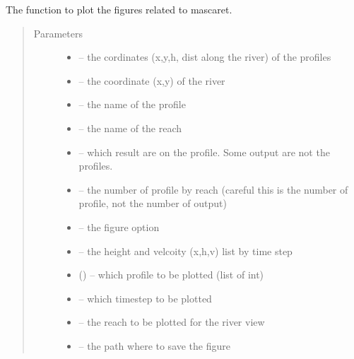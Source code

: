 \documentclass[letterpaper,10pt,english]{sphinxmanual}
\begin{document}
\begin{fulllineitems}
\label{\detokenize{index:src.mascaret.figure_mascaret}}
The function to plot the figures related to mascaret.
\begin{quote}\begin{description}
\item[{Parameters}] \leavevmode\begin{itemize}
\item {} 
 -- the cordinates (x,y,h, dist along the river) of the profiles

\item {} 
 -- the coordinate (x,y) of the river

\item {} 
 -- the name of the profile

\item {} 
 -- the name of the reach

\item {} 
 -- which result are on the profile. Some output are not the profiles.

\item {} 
 -- the number of profile by reach (careful this is the number of profile, not the number of output)

\item {} 
 -- the figure option

\item {} 
 -- the height and velcoity (x,h,v) list by time step

\item {} 
 () -- which profile to be plotted (list of int)

\item {} 
 -- which timestep to be plotted

\item {} 
 -- the reach to be plotted for the river view

\item {} 
 -- the path where to save the figure

\end{itemize}

\end{description}\end{quote}

\end{fulllineitems}
\end{document}
